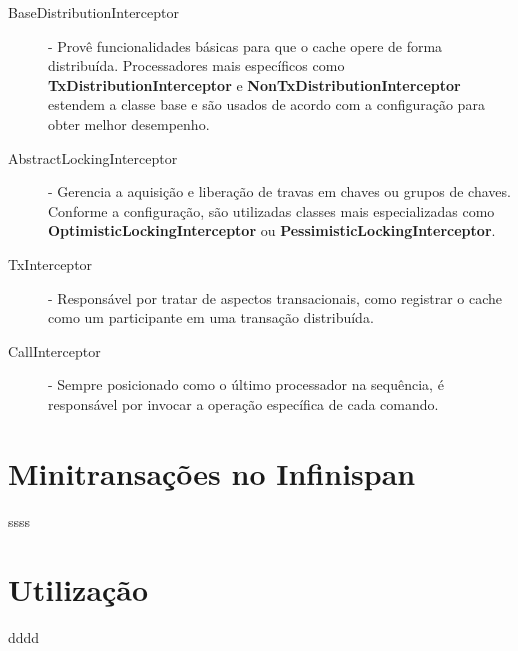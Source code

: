 \documentclass[11pt,twoside,a4paper]{book}
\renewcommand{\chaptermark}[1]{\markboth{\MakeUppercase{#1}}{}}
\begin{document}
\begin{description} 
	\item[BaseDistributionInterceptor] - Provê funcionalidades básicas para que o cache opere de forma distribuída. Processadores mais específicos como \textbf{TxDistributionInterceptor} e \textbf{NonTxDistributionInterceptor} estendem a classe base e são usados de acordo com a configuração para obter melhor desempenho.
	\item[AbstractLockingInterceptor] - Gerencia a aquisição e liberação de travas em chaves ou grupos de chaves. Conforme a configuração, são utilizadas classes mais especializadas como \textbf{OptimisticLockingInterceptor} ou \textbf{PessimisticLockingInterceptor}.
	\item[TxInterceptor] - Responsável por tratar de aspectos transacionais, como registrar o cache como um participante em uma transação distribuída.
	\item[CallInterceptor] - Sempre posicionado como o último processador na sequência, é responsável por invocar a operação específica de cada comando.
\end{description}

\section{Minitransações no Infinispan}
\label{sec:mt_infinispan}
ssss

\section{Utilização}
\label{sec:utilizacao}
dddd

\renewcommand{\chaptermark}[1]{\markboth{\MakeUppercase{\appendixname\ \thechapter}} {\MakeUppercase{#1}} }
\fancyhead[RE,LO]{}
\appendix

\backmatter \singlespacing   %
\end{document}
